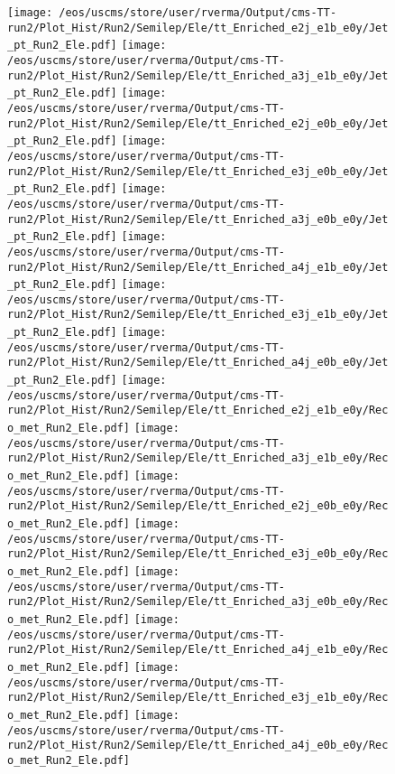 \begin{figure}
\centering
\texttt{[image: /eos/uscms/store/user/rverma/Output/cms-TT-run2/Plot\_Hist/Run2/Semilep/Ele/tt\_Enriched\_e2j\_e1b\_e0y/Jet\_pt\_Run2\_Ele.pdf]}
\texttt{[image: /eos/uscms/store/user/rverma/Output/cms-TT-run2/Plot\_Hist/Run2/Semilep/Ele/tt\_Enriched\_a3j\_e1b\_e0y/Jet\_pt\_Run2\_Ele.pdf]}
\texttt{[image: /eos/uscms/store/user/rverma/Output/cms-TT-run2/Plot\_Hist/Run2/Semilep/Ele/tt\_Enriched\_e2j\_e0b\_e0y/Jet\_pt\_Run2\_Ele.pdf]}
\texttt{[image: /eos/uscms/store/user/rverma/Output/cms-TT-run2/Plot\_Hist/Run2/Semilep/Ele/tt\_Enriched\_e3j\_e0b\_e0y/Jet\_pt\_Run2\_Ele.pdf]}
\texttt{[image: /eos/uscms/store/user/rverma/Output/cms-TT-run2/Plot\_Hist/Run2/Semilep/Ele/tt\_Enriched\_a3j\_e0b\_e0y/Jet\_pt\_Run2\_Ele.pdf]}
\texttt{[image: /eos/uscms/store/user/rverma/Output/cms-TT-run2/Plot\_Hist/Run2/Semilep/Ele/tt\_Enriched\_a4j\_e1b\_e0y/Jet\_pt\_Run2\_Ele.pdf]}
\texttt{[image: /eos/uscms/store/user/rverma/Output/cms-TT-run2/Plot\_Hist/Run2/Semilep/Ele/tt\_Enriched\_e3j\_e1b\_e0y/Jet\_pt\_Run2\_Ele.pdf]}
\texttt{[image: /eos/uscms/store/user/rverma/Output/cms-TT-run2/Plot\_Hist/Run2/Semilep/Ele/tt\_Enriched\_a4j\_e0b\_e0y/Jet\_pt\_Run2\_Ele.pdf]}
\texttt{[image: /eos/uscms/store/user/rverma/Output/cms-TT-run2/Plot\_Hist/Run2/Semilep/Ele/tt\_Enriched\_e2j\_e1b\_e0y/Reco\_met\_Run2\_Ele.pdf]}
\texttt{[image: /eos/uscms/store/user/rverma/Output/cms-TT-run2/Plot\_Hist/Run2/Semilep/Ele/tt\_Enriched\_a3j\_e1b\_e0y/Reco\_met\_Run2\_Ele.pdf]}
\texttt{[image: /eos/uscms/store/user/rverma/Output/cms-TT-run2/Plot\_Hist/Run2/Semilep/Ele/tt\_Enriched\_e2j\_e0b\_e0y/Reco\_met\_Run2\_Ele.pdf]}
\texttt{[image: /eos/uscms/store/user/rverma/Output/cms-TT-run2/Plot\_Hist/Run2/Semilep/Ele/tt\_Enriched\_e3j\_e0b\_e0y/Reco\_met\_Run2\_Ele.pdf]}
\texttt{[image: /eos/uscms/store/user/rverma/Output/cms-TT-run2/Plot\_Hist/Run2/Semilep/Ele/tt\_Enriched\_a3j\_e0b\_e0y/Reco\_met\_Run2\_Ele.pdf]}
\texttt{[image: /eos/uscms/store/user/rverma/Output/cms-TT-run2/Plot\_Hist/Run2/Semilep/Ele/tt\_Enriched\_a4j\_e1b\_e0y/Reco\_met\_Run2\_Ele.pdf]}
\texttt{[image: /eos/uscms/store/user/rverma/Output/cms-TT-run2/Plot\_Hist/Run2/Semilep/Ele/tt\_Enriched\_e3j\_e1b\_e0y/Reco\_met\_Run2\_Ele.pdf]}
\texttt{[image: /eos/uscms/store/user/rverma/Output/cms-TT-run2/Plot\_Hist/Run2/Semilep/Ele/tt\_Enriched\_a4j\_e0b\_e0y/Reco\_met\_Run2\_Ele.pdf]}

\end{figure}
